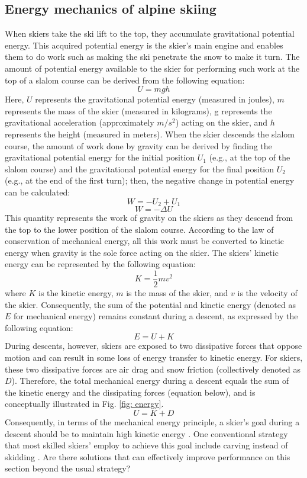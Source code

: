 \subsection{Energy mechanics of alpine skiing}\label{introduction: energymechanics}
When skiers take the ski lift to the top, they  accumulate gravitational potential energy. This acquired potential energy is the skier's main engine \cite{supej_differential_2008, supej_mechanical_2011} and enables them to do work such as making the ski penetrate the snow to make it turn. The amount of potential energy available to the skier for performing such work at the top of a slalom course can be derived from the following equation:
\[U=mgh\]
Here, $U$ represents the gravitational potential energy (measured in joules), $m$ represents the mass of the skier (measured in kilograms), g represents the gravitational acceleration (approximately $m/s^2$) acting on the skier, and $h$ represents the height (measured in meters). When the skier descends the slalom course, the amount of work done by gravity can be derived by finding the gravitational potential energy for the initial position $U_1$ (e.g., at the top of the slalom course) and the gravitational potential energy for the final position $U_2$ (e.g., at the end of the first turn); then, the negative change in potential energy can be calculated: 
\[W=-U_2 + U_1\]
\[W= -\Delta U \]
This quantity represents the work of gravity on the skiers as they descend from the top to the lower position of the slalom course. According to the law of conservation of mechanical energy, all this work must be converted to kinetic energy when gravity is the sole force acting on the skier. The skiers' kinetic energy can be represented by the following equation:
\[ K = \frac{1}{2} m v^2 \]
where $K$ is the kinetic energy, $m$ is the mass of the skier, and $v$ is the velocity of the skier. Consequently, the sum of the potential and kinetic energy  (denoted as $E$ for mechanical energy) remains constant during a descent, as expressed by the following equation:
\[ E = U + K \]
During descents, however, skiers are exposed to two dissipative forces that oppose motion and can result in some loss of energy transfer to kinetic energy. For skiers, these two dissipative forces are air drag and snow friction (collectively denoted as $D$)\cite{supej_differential_2008}. Therefore, the total mechanical energy during a descent equals the sum of the kinetic energy and the dissipating forces (equation below), and is conceptually illustrated in Fig. \ref{fig: energy}.
\[ U = K + D\]
Consequently, in terms of the mechanical energy principle, a skier's goal during a descent should be to maintain high kinetic energy \cite{supej_differential_2008, supej_mechanical_2011, supej_how_2010}. One conventional strategy that most skilled skiers' employ to achieve this goal include carving instead of skidding \cite{supej_differential_2008, supej_relations_2006, reid_kinematic_2010, reid_turn_2009}. Are there solutions that can effectively improve performance on this section beyond the usual strategy? 


